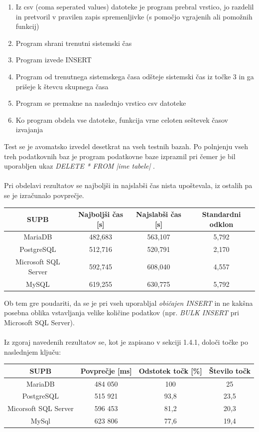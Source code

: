 \documentclass[a4paper,11pt]{report}
\begin{document}
\begin{enumerate}
   \item Iz csv (coma seperated values) datoteke je program prebral vrstico, jo razdelil in pretvoril v pravilen zapis spremenljivke (s pomočjo vgrajenih ali pomožnih funkcij)
   \item Program shrani trenutni sistemski čas
   \item Program izvede INSERT
   \item Program od trenutnega sistemskega časa odšteje sistemski čas iz točke 3 in ga prišeje k števcu skupnega časa 
   \item Program se premakne na naslednjo vrstico csv datoteke
   \item Ko program obdela vse datoteke, funkcija vrne celoten seštevek časov izvajanja
\end{enumerate}
Test se je avomatsko izvedel desetkrat na vseh testnih bazah.
Po polnjenju vseh treh podatkovnih baz je program podatkovne baze izpraznil pri čemer je bil uporabljen ukaz \textit{DELETE * FROM |ime tabele| }. 
\\\\
Pri obdelavi rezultatov se najboljši in najslabši čas nista upoštevala, iz ostalih pa se je izračunalo povprečje.

\begin{center}
   \begin{tabular}{||c|c|c|c||}
      \hline
      \textbf{SUPB} & \textbf{Najboljši čas [s]} & \textbf{Najslabši čas [s]} & \textbf{Standardni odklon} \\
      \hline
      \hline
      MariaDB & 482,683 & 563,107 & 5,792 \\
      PostgreSQL & 512,716 & 520,791 & 2,170 \\
      Microsoft SQL Server & 592,745 & 608,040 & 4,557 \\
      MySQL & 619,255 & 630,775 & 5,792\\
      \hline
   \end{tabular}
\end{center}

Ob tem gre poudariti, da se je pri vseh uporabljal \textit{običajen INSERT} in ne kakšna posebna oblika vstavljanja velike količine podatkov (npr. \textit{BULK INSERT} pri Microsoft SQL Server).
\\\\
Iz zgoraj navedenih rezultatov se, kot je zapisano v sekciji 1.4.1, določi točke po naslednjem ključu:

\begin{center}
   \begin{tabular}{||c|c|c|c||}
      \hline
      \textbf{SUPB} & Povprečje [ms] & Odstotek točk [\%] & Število točk\\
      \hline
      \hline
      MariaDB & 484 050 & 100 & 25\\
      PostgreSQL & 515 921 & 93,8 & 23,5\\
      Micorsoft SQL Server & 596 453 & 81,2 & 20,3\\
      MySql & 623 806 & 77,6 & 19,4\\
      \hline
   \end{tabular}
\end{center}
\end{document}
